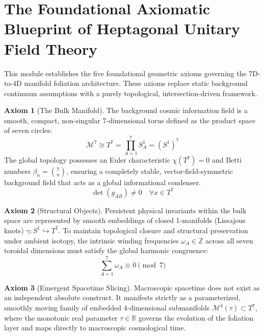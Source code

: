 \documentclass[12pt,letterpaper]{article}
\theoremstyle{definition}
\newtheorem{axiom}{Axiom}
\begin{document}
\section*{The Foundational Axiomatic Blueprint of Heptagonal Unitary Field Theory}

This module establishes the five foundational geometric axioms governing the 7D-to-4D manifold foliation architecture. These axioms replace static background continuum assumptions with a purely topological, intersection-driven framework.

\begin{axiom}[The Bulk Manifold]
The background cosmic information field is a smooth, compact, non-singular 7-dimensional torus defined as the product space of seven circles:
\begin{equation}
    \mathcal{M}^7 \cong T^7 = \prod_{A=1}^{7} S^1_A = (S^1)^7
\end{equation}
The global topology possesses an Euler characteristic $\chi(T^7) = 0$ and Betti numbers $\beta_n = \binom{7}{n}$, ensuring a completely stable, vector-field-symmetric background field that acts as a global informational condenser.
\begin{equation}
    \det(g_{AB}) \neq 0 \quad \forall x \in T^7
\end{equation}
\end{axiom}

\begin{axiom}[Structural Objects]
Persistent physical invariants within the bulk space are represented by smooth embeddings of closed 1-manifolds (Lissajous knots) $\gamma: S^1 \hookrightarrow T^7$. To maintain topological closure and structural preservation under ambient isotopy, the intrinsic winding frequencies $\omega_A \in \mathbb{Z}$ across all seven toroidal dimensions must satisfy the global harmonic congruence:
\begin{equation}
    \sum_{A=1}^{7} \omega_A \equiv 0 \pmod 7
\end{equation}
\end{axiom}

\begin{axiom}[Emergent Spacetime Slicing]
Macroscopic spacetime does not exist as an independent absolute construct. It manifests strictly as a parameterized, smoothly moving family of embedded 4-dimensional submanifolds $\mathcal{M}^4(\tau) \subset T^7$, where the monotonic real parameter $\tau \in \mathbb{R}$ governs the evolution of the foliation layer and maps directly to macroscopic cosmological time.
\end{axiom}
\end{document}
